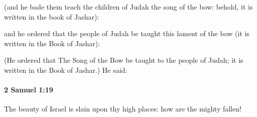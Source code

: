 			\begin{versebox}
					\item[BHS] 
					\item[ASV] (and he bade them teach the children of Judah the song of the bow: behold, it is written in the book of Jashar):
					\item[NIV] and he ordered that the people of Judah be taught this lament of the bow (it is written in the Book of Jashar):
					\item[NRSV] (He ordered that The Song of the Bow be taught to the people of Judah; it is written in the Book of Jashar.) He said:
			\end{versebox}

		\paragraph{2 Samuel 1:19} %
			\label{2SAMUEL-1-19}

			The beauty of Israel is slain upon thy high places: how are the mighty fallen!

